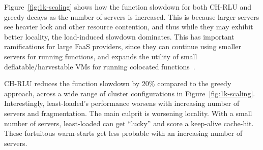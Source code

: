 Figure~\ref{fig:1k-scaling} shows how the function slowdown for both CH-RLU and greedy decays as the number of servers is increased.  
This is because larger servers see heavier lock and other resource contention, and thus while they may exhibit better locality, the load-induced slowdown dominates.
This has important ramifications for large FaaS providers, since they can continue using smaller servers for running functions, and expands the utility of small deflatable/harvestable VMs for running colocated functions~\cite{serverless-harvest-sosp21}.

CH-RLU reduces the function slowdown by 20\% compared to the greedy approach, across a wide range of cluster configurations in Figure~\ref{fig:1k-scaling}. 
Interestingly, least-loaded's performance worsens with increasing number of servers and fragmentation.
The main culprit is worsening locality.
With a small number of servers, least-loaded can get ``lucky'' and score a keep-alive cache-hit.
These fortuitous warm-starts get less probable with an increasing number of servers. 


